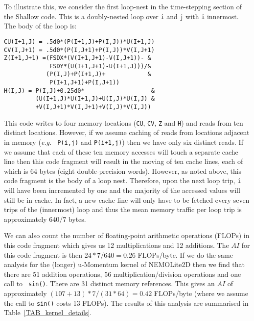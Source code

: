 \documentclass[12pt]{article}
\begin{document}
To illustrate this, we consider the first loop-nest in the
time-stepping section of the Shallow code. This is a doubly-nested
loop over {\tt i} and {\tt j} with {\tt i} innermost. The body of the
loop is:
\begin{verbatim}
CU(I+1,J) = .5d0*(P(I+1,J)+P(I,J))*U(I+1,J)
CV(I,J+1) = .5d0*(P(I,J+1)+P(I,J))*V(I,J+1)
Z(I+1,J+1) =(FSDX*(V(I+1,J+1)-V(I,J+1))- &
             FSDY*(U(I+1,J+1)-U(I+1,J)))/&
            (P(I,J)+P(I+1,J)+            &
             P(I+1,J+1)+P(I,J+1))
H(I,J) = P(I,J)+0.25d0*                   &
         (U(I+1,J)*U(I+1,J)+U(I,J)*U(I,J) & 
         +V(I,J+1)*V(I,J+1)+V(I,J)*V(I,J))
\end{verbatim}
This code writes to four memory locations ({\tt CU}, {\tt CV}, {\tt Z}
and {\tt H}) and reads from ten distinct locations.  However, if we
assume caching of reads from locations adjacent in memory ({\it e.g.} {\tt
  P(i,j)} and {\tt P(i+1,j)}) then we have only six distinct reads.
If we assume that each of these ten memory accesses will touch a
separate cache line then this code fragment will result in the moving
of ten cache lines, each of which is 64 bytes (eight double-precision
words). However, as noted above, this code fragment is the body of a
loop nest. Therefore, upon the next loop trip, {\tt i} will have been
incremented by one and the majority of the accessed values will still
be in cache. In fact, a new cache line will only have to be fetched
every seven trips of the (innermost) loop and thus the mean memory
traffic per loop trip is approximately $640/7$ bytes.

We can also count the number of floating-point arithmetic operations
(FLOPs) in this code fragment which gives us 12 multiplications and 12
additions. The $AI$ for this code fragment is then $24*7/640 = 0.26$
FLOPs/byte.  If we do the same analysis for the (longer) u-Momentum
kernel of NEMOLite2D then we find that there are 51 addition
operations, 56 multiplication/division operations and one call to {\tt
  sin()}. There are 31 distinct memory references. This gives an $AI$
of approximately $(107+13)*7/(31*64) = 0.42$ FLOPs/byte (where we
assume the call to {\tt sin()} costs 13 FLOPs). The results of this
analysis are summarised in Table~\ref{TAB_kernel_details}.
\end{document}
